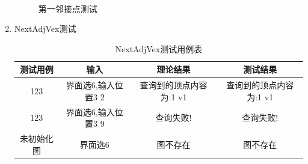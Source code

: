 \documentclass[supercite]{HustGraduPaper}
\theoremstyle{definition}
\begin{document}
\begin{enumerate}
\begin{figure}[htb]
		      \quad
		      \\
		      \caption{第一邻接点测试}
	      \end{figure}
	      \newpage
	\item NextAdjVex测试
	      \begin{table}[htb]
		      \begin{center}
			      \setlength{\tabcolsep}{2.0mm}
			      \caption{NextAdjVex测试用例表}
			      \label{t6}
			      \begin{tabular}{|c|c|c|c|}
				      \hline
				      测试用例   & 输入                & 理论结果                & 测试结果                \\
				      \hline
				      \hline
				      123        & 界面选6,输入位置3 2 & 查询到的顶点内容为:1 v1 & 查询到的顶点内容为:1 v1 \\
				      \hline
				      123        & 界面选6,输入位置3 9 & 查询失败!               & 查询失败!               \\
				      \hline
				      未初始化图 & 界面选6             & 图不存在                & 图不存在                \\
				      \hline
			      \end{tabular}
		      \end{center}
	      \end{table}

\end{enumerate}
\end{document}
